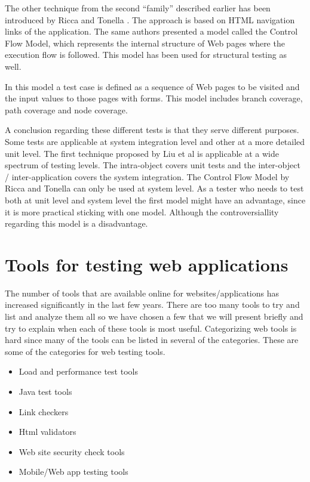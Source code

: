 \documentclass[a4paper, twocolumn]{ieee}
\begin{document}
The other technique from the second “family” described earlier has been introduced by Ricca and
Tonella \cite{rt01}. The approach is based on HTML navigation links of the application. The same authors
presented a model called the Control Flow Model, which represents the internal structure of Web
pages where the execution flow is followed. This model has been used for structural testing as well.

In this model a test case is defined as a sequence of Web pages to be visited and the input values to
those pages with forms. This model includes branch coverage, path coverage and node coverage.

A conclusion regarding these different tests is that they serve different purposes. Some tests are
applicable at system integration level and other at a more detailed unit level. The first technique
proposed by Liu et al is applicable at a wide spectrum of testing levels. The intra-object covers unit
tests and the inter-object / inter-application covers the system integration. The Control Flow Model
by Ricca and Tonella can only be used at system level. As a tester who needs to test both at unit level
and system level the first model might have an advantage, since it is more practical sticking with one
model. Although the controversiallity regarding this model is a disadvantage.


\section{Tools for testing web applications}

 The number of tools that are available online for websites/applications has increased significantly in the last few years. There are too many tools to try and list and analyze them all so we have chosen a few that we will present briefly and try to explain when each of these tools is most useful. 
 Categorizing web tools is hard since many of the tools can be listed in several of the categories. These are some of the categories for web testing tools.  

 \begin {itemize}
 \item Load and performance test tools  
 \item Java test tools 
 \item Link checkers 
 \item Html validators 
 \item Web site security check tools 
 \item Mobile/Web app testing tools
 \end {itemize}
 
\end{document}
